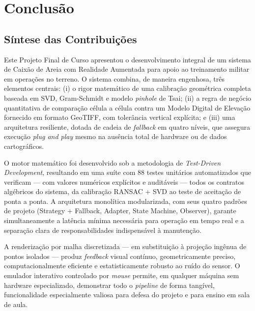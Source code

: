 
\chapter{Conclusão}
\label{cap:conclusao}

\section{Síntese das Contribuições}

Este Projeto Final de Curso apresentou o desenvolvimento integral de
um sistema de Caixão de Areia com Realidade Aumentada para apoio ao
treinamento militar em operações no terreno. O sistema combina,
de maneira engenhosa, três elementos centrais: (i) o rigor matemático
de uma calibração geométrica completa baseada em SVD, Gram-Schmidt e
modelo \textit{pinhole} de Tsai; (ii) a regra de negócio quantitativa
de comparação célula a célula contra um Modelo Digital de Elevação
fornecido em formato GeoTIFF, com tolerância vertical explícita; e
(iii) uma arquitetura resiliente, dotada de cadeia de
\textit{fallback} em quatro níveis, que assegura execução
\textit{plug and play} mesmo na ausência total de hardware ou de
dados cartográficos.

O motor matemático foi desenvolvido sob a metodologia de
\textit{Test-Driven Development}, resultando em uma suíte com 88
testes unitários automatizados que verificam — com valores numéricos
explícitos e auditáveis — todos os contratos algébricos do sistema,
da calibração RANSAC + SVD ao teste de aceitação de ponta a ponta.
A arquitetura monolítica modularizada, com seus quatro padrões de
projeto (Strategy + Fallback, Adapter, State Machine, Observer),
garante simultaneamente a latência mínima necessária para operação
em tempo real e a separação clara de responsabilidades indispensável
à manutenção.

A renderização por malha discretizada — em substituição à projeção
ingênua de pontos isolados — produz \textit{feedback} visual
contínuo, geometricamente preciso, computacionalmente eficiente e
estatisticamente robusto ao ruído do sensor. O emulador interativo
controlado por \emph{mouse} permite, em qualquer máquina sem hardware
especializado, demonstrar todo o \textit{pipeline} de forma tangível,
funcionalidade especialmente valiosa para defesa do projeto e para
ensino em sala de aula.

